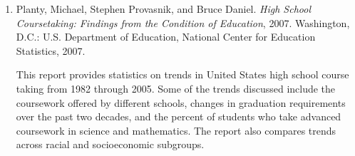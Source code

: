 {{\begin{enumerate}
          \par\noindent\hspace*{1em} This work is a report of a study comparing seven public high schools-four of which demonstrated incredible growth in students who entered high school significantly behind their peers. These four exemplar schools were compared against high schools that had average growth. The schools all had similar demographics-predominantly minority and low-socioeconomic-status student populations. The study reveals those approaches adopted in the successful schools.\vspace{2.35\baselineskip}

        \item Planty, Michael, Stephen Provasnik, and Bruce Daniel. \emph{High School Coursetaking: Findings from the Condition of Education}, 2007. Washington, D.C.: U.S. Department of Education, National Center for Education Statistics, 2007.\vspace{.25\baselineskip}

          \par\noindent\hspace*{1em} This report provides statistics on trends in United States high school course taking from 1982 through 2005. Some of the trends discussed include the coursework offered by different schools, changes in graduation requirements over the past two decades, and the percent of students who take advanced coursework in science and mathematics. The report also compares trends across racial and socioeconomic subgroups.\vspace{.35\baselineskip}
      \end{enumerate}}
  }
